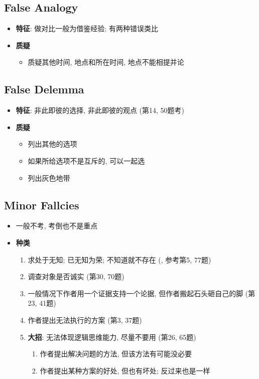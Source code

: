   \subsection{False Analogy}

    \begin{itemize}
      \item \textbf{特征}: 做对比一般为借鉴经验; 有两种错误类比
      \item \textbf{质疑}
      \begin{itemize}
        \item 质疑其他时间, 地点和所在时间, 地点不能相提并论
      \end{itemize}
    \end{itemize}

  \subsection{False Delemma}

    \begin{itemize}
      \item \textbf{特征}: 非此即彼的选择, 非此即彼的观点 (第14, 50题考)
      \item \textbf{质疑}
      \begin{itemize}
        \item 列出其他的选项
        \item 如果所给选项不是互斥的, 可以一起选
        \item 列出灰色地带
      \end{itemize}
    \end{itemize}

  \subsection{Minor Fallcies}

    \begin{itemize}
      \item 一般不考, 考倒也不是重点
      \item \textbf{种类}
      \begin{enumerate}
        \item 求处于无知; 已无知为荣; 不知道就不存在
        (, 参考第5, 77题)
        \item 调查对象是否诚实 (第30, 70题)
        \item 一般情况下作者用一个证据支持一个论据, 但作者搬起石头砸自己的脚 (第23, 41题)
        \item 作者提出无法执行的方案 (第3, 37题)
        \item \textbf{大招}: 无法体现逻辑思维能力, 尽量不要用 (第26, 65题)
        \begin{enumerate}
          \item 作者提出解决问题的方法, 但该方法有可能没必要
          \item 作者提出某种方案的好处, 但也有坏处; 反过来也是一样
        \end{enumerate}
      \end{enumerate}
    \end{itemize}

